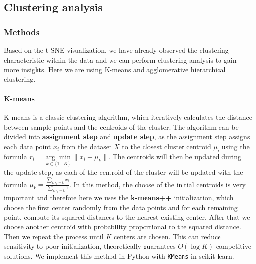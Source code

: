 \documentclass{article}
\begin{document}
\subsection{Clustering analysis}





\subsubsection*{Methods}

Based on the t-SNE visualization, we have already observed the clustering characteristic within the data and we can perform clustering analysis to gain more insights. Here we are using K-means and agglomerative hierarchical clustering.

\paragraph{K-means} K-means is a classic clustering algorithm, which iteratively calculates the distance between sample points and the centroids of the cluster. The algorithm can be divided into \textbf{assignment step} and \textbf{update step}, as the assignment step assigns each data point $x_i$ from the dataset $X$ to the closest cluster centroid $\mu_i$ using the formula $r_i = \underset{k\in \{1\ldots K\} }{\arg\min}{ \|x_{i}-\mu_k\| }$. The centroids will then be updated during the
update step, as each of the centroid of the cluster will be updated with the formula $\mu_k = \frac{\sum_{i:r_i=k}^{} x_i}{\sum_{i:r_i=k}^{} 1}$. In this method, the choose of the initial centroids is very important and therefore here we uses the \textbf{k-means++} initialization, which choose the first center randomly from the data points and for each remaining point, compute its squared distances to the nearest existing center. After that we choose another centroid with
probability proportional to the squared distance. Then we repeat the process until $K$ centers are chosen. This can reduce sensitivity to poor initialization, theoretically guarantees $O(\log K)$-competitive solutions. We implement this method in Python with \texttt{KMeans} in scikit-learn.
\end{document}
